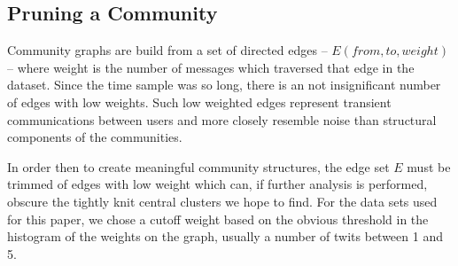 \subsection{Pruning a Community}
Community graphs are build from a set of directed edges -- $E(from,to,weight)$ -- where weight is the number of messages which traversed that edge in the dataset.  Since the time sample was so long, there is an not insignificant number of edges with low weights.  Such low weighted edges represent transient communications between users and more closely resemble noise than structural components of the communities.

In order then to create meaningful community structures, the edge set $E$ must be trimmed of edges with low weight which can, if further analysis is performed, obscure the tightly knit central clusters we hope to find.  For the data sets used for this paper, we chose a cutoff weight based on the obvious threshold in the histogram of the weights on the graph, usually a number of twits between 1 and 5.